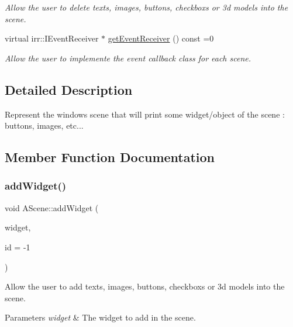 \begin{DoxyCompactItemize}
\begin{DoxyCompactList}\small\item\em Allow the user to delete texts, images, buttons, checkboxs or 3d models into the scene. \end{DoxyCompactList}\item 
virtual irr\+::\+I\+Event\+Receiver $\ast$ \hyperlink{classAScene_af521e5e6d30a5d2e5d30eb333e4d3abd}{get\+Event\+Receiver} () const =0
\begin{DoxyCompactList}\small\item\em Allow the user to implemente the event callback class for each scene. \end{DoxyCompactList}\end{DoxyCompactItemize}


\subsection{Detailed Description}
Represent the window\textquotesingle{}s scene that will print some widget/object of the scene \+: buttons, images, etc... 

\subsection{Member Function Documentation}
\mbox{\label{classAScene_aa711b6068dd8dee262160eedfd96ad02}} 
\subsubsection{\texorpdfstring{add\+Widget()}{addWidget()}}
{\footnotesize\ttfamily void A\+Scene\+::add\+Widget (\begin{DoxyParamCaption}\item[{const std\+::shared\+\_\+ptr$<$ \hyperlink{classIWidget}{I\+Widget} $>$ \&}]{widget,  }\item[{Int}]{id = {\ttfamily -\/1} }\end{DoxyParamCaption})}



Allow the user to add texts, images, buttons, checkboxs or 3d models into the scene. 


\begin{DoxyParams}{Parameters}
{\em widget} & The widget to add in the scene. \\
\hline
\end{DoxyParams}
\mbox{\label{classAScene_ad2b0ac8cd74a8523c76b681a34b5f5b4}} 
